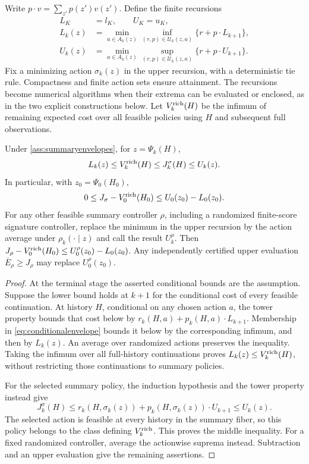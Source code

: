 Write $p\cdot v=\sum_{z'}p(z')v(z')$. Define the finite recursions
\begin{align}\label{eq:summarysandwichdp}
 L_K&=l_K,\qquad U_K=u_K,\nonumber\\
 L_k(z)&=\min_{a\in A_k(z)}\inf_{(r,p)\in\mathcal U_k(z,a)}
                   \{r+p\cdot L_{k+1}\},\\
 U_k(z)&=\min_{a\in A_k(z)}\sup_{(r,p)\in\mathcal U_k(z,a)}
                   \{r+p\cdot U_{k+1}\}.\nonumber
\end{align}
Fix a minimizing action $\sigma_k(z)$ in the upper recursion, with a
deterministic tie rule. Compactness and finite action sets ensure attainment.
The recursions become numerical algorithms when their extrema can be
evaluated or enclosed, as in the two explicit constructions below.
Let $V_k^{\rm rich}(H)$ be the infimum of remaining expected cost over all
feasible policies using $H$ and subsequent full observations.

\begin{theorem}
\label{thm:summarysandwich}
Under \cref{ass:summaryenvelopes}, for $z=\Psi_k(H)$,
\begin{equation}\label{eq:summarysandwich}
 L_k(z)\le V_k^{\rm rich}(H)\le J_k^\sigma(H)\le U_k(z).
\end{equation}
In particular, with $z_0=\Psi_0(H_0)$,
\begin{equation}\label{eq:summaryregret}
 0\le J_\sigma-V_0^{\rm rich}(H_0)\le U_0(z_0)-L_0(z_0).
\end{equation}
For any other feasible summary controller $\rho$, including a randomized
finite-score signature controller, replace the minimum in the upper recursion
by the action average under $\rho_k(\cdot\mid z)$ and call the result
$U_k^\rho$. Then $J_\rho-V_0^{\rm rich}(H_0)\le U_0^\rho(z_0)-L_0(z_0)$.
Any independently certified upper evaluation $\overline E_\rho\ge J_\rho$
may replace $U_0^\rho(z_0)$.
\end{theorem}
\begin{proof}
At the terminal stage the asserted conditional bounds are the assumption.
Suppose the lower bound holds at $k+1$ for the conditional cost of every
feasible continuation. At history $H$, conditional on any chosen action $a$,
the tower property bounds that cost below by
$r_k(H,a)+p_k(H,a)\cdot L_{k+1}$. Membership in
\eqref{eq:conditionalenvelope} bounds it below by the corresponding infimum,
and then by $L_k(z)$. An average over randomized actions preserves the
inequality. Taking the infimum over all full-history continuations proves
$L_k(z)\le V_k^{\rm rich}(H)$, without restricting those continuations to
summary policies.

For the selected summary policy, the induction hypothesis and the tower
property instead give
\[
 J_k^\sigma(H)\le r_k(H,\sigma_k(z))+
       p_k(H,\sigma_k(z))\cdot U_{k+1}\le U_k(z).
\]
The selected action is feasible at every history in the summary fiber, so
this policy belongs to the class defining $V_k^{\rm rich}$. This proves the
middle inequality. For a fixed randomized controller, average the
actionwise suprema instead. Subtraction and an upper evaluation give the
remaining assertions.
\end{proof}

